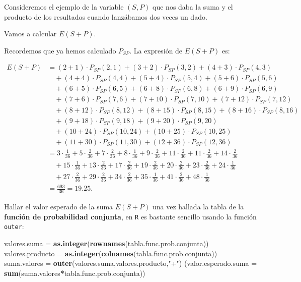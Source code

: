 \documentclass[]{book}
\newenvironment{Shaded}{\begin{snugshade}}{\end{snugshade}}
\newcommand{\DataTypeTok}[1]{\textcolor[rgb]{0.13,0.29,0.53}{#1}}
\newcommand{\KeywordTok}[1]{\textcolor[rgb]{0.13,0.29,0.53}{\textbf{#1}}}
\newcommand{\NormalTok}[1]{#1}
\newcommand{\OperatorTok}[1]{\textcolor[rgb]{0.81,0.36,0.00}{\textbf{#1}}}
\newcommand{\StringTok}[1]{\textcolor[rgb]{0.31,0.60,0.02}{#1}}
\begin{document}
Consideremos el ejemplo de la variable \((S,P)\) que nos daba la suma y el producto de los resultados cuando lanzábamos dos veces un dado.

Vamos a calcular \(E(S+P)\).

Recordemos que ya hemos calculado \(P_{SP}\). La expresión de \(E(S+P)\) es:

\[
\begin{array}{rl}
E(S+P) & = (2+1)\cdot P_{SP}(2,1)+(3+2)\cdot P_{SP}(3,2)+(4+3)\cdot P_{SP}(4,3)  \\ &
\quad +(4+4)\cdot P_{SP}(4,4) + (5+4)\cdot P_{SP}(5,4)+(5+6)\cdot P_{SP}(5,6)\\ & 
\quad +(6+5)\cdot P_{SP}(6,5)+(6+8)\cdot P_{SP}(6,8)+ (6+9)\cdot P_{SP}(6,9) \\ &
\quad + (7+6)\cdot P_{SP}(7,6)+(7+10)\cdot P_{SP}(7,10)+(7+12)\cdot P_{SP}(7,12)\\ & 
\quad + (8+12)\cdot P_{SP}(8,12)+(8+15)\cdot P_{SP}(8,15)+(8+16)\cdot P_{SP}(8,16)\\ & 
\quad +(9+18)\cdot P_{SP}(9,18)+ (9+20)\cdot P_{SP}(9,20)\\ & 
\quad +(10+24)\cdot P_{SP}(10,24) +(10+25)\cdot P_{SP}(10,25)\\ &
\quad +(11+30)\cdot P_{SP}(11,30)  + (12+36)\cdot P_{SP}(12,36) \\ & 
=  3\cdot \frac{1}{36}+5\cdot\frac{2}{36}+7\cdot \frac{2}{36}+8\cdot \frac{1}{36}+9\cdot \frac{2}{36}+11\cdot\frac{2}{36}+11\cdot \frac{2}{36}+14\cdot\frac{2}{36}
\\ &  \quad  +15\cdot\frac{1}{36} + 13\cdot\frac{2}{36}+17\cdot\frac{2}{36}+19\cdot\frac{2}{36}+20\cdot\frac{2}{36}+23\cdot\frac{2}{36}+24\cdot\frac{1}{36}
\\ & \quad+27\cdot\frac{2}{36}+29\cdot\frac{2}{36} + 34\cdot\frac{2}{36}+35\cdot\frac{1}{36}+41\cdot\frac{2}{36}+48\cdot\frac{1}{36}\\
& =\frac{693}{36}= 19.25.
\end{array}
\]

Hallar el valor esperado de la suma \(E(S+P)\) una vez hallada la tabla de la \textbf{función de probabilidad conjunta}, en \texttt{R} es bastante sencillo usando la función \texttt{outer}:

\begin{Shaded}
\begin{Highlighting}[]
\NormalTok{valores.suma =}\StringTok{ }\KeywordTok{as.integer}\NormalTok{(}\KeywordTok{rownames}\NormalTok{(tabla.func.prob.conjunta))}
\NormalTok{valores.producto =}\StringTok{ }\KeywordTok{as.integer}\NormalTok{(}\KeywordTok{colnames}\NormalTok{(tabla.func.prob.conjunta))}
\NormalTok{suma.valores =}\StringTok{ }\KeywordTok{outer}\NormalTok{(valores.suma,valores.producto,}\StringTok{"+"}\NormalTok{)}
\NormalTok{(}\DataTypeTok{valor.esperado.suma =} \KeywordTok{sum}\NormalTok{(suma.valores}\OperatorTok{*}\NormalTok{tabla.func.prob.conjunta))}
\end{Highlighting}
\end{Shaded}
\end{document}
